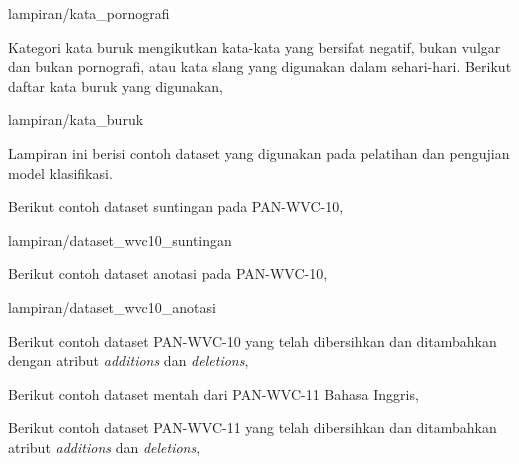 	
		{lampiran/kata_pornografi}

\label{lampiran:words_bad}

Kategori kata buruk mengikutkan kata-kata yang bersifat negatif, bukan vulgar
dan bukan pornografi, atau kata slang yang digunakan dalam sehari-hari.
Berikut daftar kata buruk yang digunakan,

	
		{lampiran/kata_buruk}



	\label{lampiran:dataset}

Lampiran ini berisi contoh dataset yang digunakan pada pelatihan dan pengujian
model klasifikasi.

	\label{lampiran:dataset_wvc10_suntingan}

Berikut contoh dataset suntingan pada PAN-WVC-10,


	{lampiran/dataset_wvc10_suntingan}

	\label{lampiran:dataset_wvc10_anotasi}

Berikut contoh dataset anotasi pada PAN-WVC-10,


	{lampiran/dataset_wvc10_anotasi}

	\label{lampiran:dataset_wvc10_gabungan}

Berikut contoh dataset PAN-WVC-10 yang telah dibersihkan dan ditambahkan dengan
atribut \textit{additions} dan \textit{deletions},



	\label{lampiran:dataset_wvc11_mentah}

Berikut contoh dataset mentah dari PAN-WVC-11 Bahasa Inggris,



	\label{lampiran:dataset_wvc11_gabungan}

Berikut contoh dataset PAN-WVC-11 yang telah dibersihkan dan ditambahkan
atribut \textit{additions} dan \textit{deletions},


